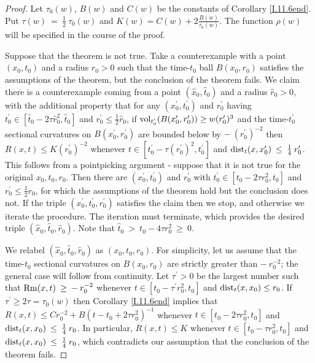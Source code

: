 \begin{proof}
Let $\tau_0(w)$, $B(w)$ and $C(w)$ be the constants of Corollary
\ref{I.11.6end}. Put $\tau(w) \: = \: \frac12 \: \tau_0(w)$ and
$K(w) = C(w) + 2 \frac{B(w)}{\tau_0(w)}$. The function $\rho(w)$
will be specified in the course of the proof.

Suppose that the theorem is not true. Take a counterexample with
a point $(x_0, t_0)$ and a radius $r_0 > 0$ such that the
time-$t_0$ ball $B(x_0, r_0)$ satisfies
the assumptions of the theorem, but the conclusion of the theorem
fails.  We claim there is a counterexample coming from a point
$(\widehat{x}_0, \widehat{t}_0)$
and a radius $\widehat{r}_0 > 0$, with the additional property that for any
$(x^\prime_0, t^\prime_0)$ and $r^\prime_0$ having
$t^\prime_0 \in [\widehat{t}_0 - 2 \tau \widehat{r}_0^2, \widehat{t}_0]$ and $r^\prime_0 \le
\frac{1}{2} \widehat{r}_0$, if $\operatorname{vol}_{t_0^\prime}(B(x_0^\prime,r_0^\prime)) \ge w
(r_0^\prime)^3$ and
the time-$t_0^\prime$ sectional curvatures on $B(x_0^\prime, r_0^\prime)$
are bounded below by
$- \: (r_0^\prime)^{-2}$ then $R(x,t) \le K (r_0^\prime)^{-2}$ whenever
$t \in [t_0^\prime - \tau (r_0^\prime)^2, t_0^\prime]$ and
$\operatorname{dist}_t(x, x_0^\prime) \: \le \: \frac14 \: r_0^\prime$.
This follows from a
pointpicking argument - suppose that it is not
true for the original $x_0, t_0, r_0$.  Then there are
$(x^\prime_0, t^\prime_0)$ and $r^\prime_0$ with
$t^\prime_0 \in [t_0 - 2 \tau r_0^2, t_0]$ and $r^\prime_0 \le
\frac{1}{2} r_0$, for which
the assumptions of the theorem hold but the conclusion
does not. If the triple
$(x^\prime_0, t^\prime_0, r^\prime_0)$ satisfies the claim then we
stop, and otherwise we iterate the procedure.  The iteration must
terminate, which provides the desired triple
$(\widehat{x}_0, \widehat{t}_0, \widehat{r}_0)$. Note that
$\widehat{t}_0 \: > \: t_0 - 4 \tau r_0^2 \: \ge \: 0$.

We relabel $(\widehat{x}_0, \widehat{t}_0, \widehat{r}_0)$ as
$({x}_0, {t}_0, {r}_0)$.
For simplicity, let us assume that
the time-$t_0$ sectional curvatures on $B(x_0, r_0)$ are strictly
greater than
$- \: r_0^{-2}$; the general case will follow from continuity.
Let $\tau^\prime > 0$ be the largest number such that
$\operatorname{Rm}(x,t) \: \ge \: -\: r_0^{-2}$ whenever
$t \in [t_0 - \tau^\prime r_0^2, t_0]$ and $\operatorname{dist}_t(x, x_0) \le r_0$.
If $\tau^\prime \ge 2 \tau = \tau_0(w)$ then Corollary
\ref{I.11.6end} implies that
$R(x,t) \le C r_0^{-2} + B (t-t_0+ 2 \tau r_0^2)^{-1}$ whenever
$t \in [t_0 - 2 \tau r_0^2, t_0]$ and
$\operatorname{dist}_t(x, x_0) \: \le \: \frac14 \: r_0$.
In particular, $R(x,t) \le K$ whenever
$t \in [t_0 - \tau r_0^2, t_0]$ and
$\operatorname{dist}_t(x, x_0) \: \le \: \frac14 \: r_0$, which contradicts our
assumption that the conclusion of the theorem fails.


\end{proof}
